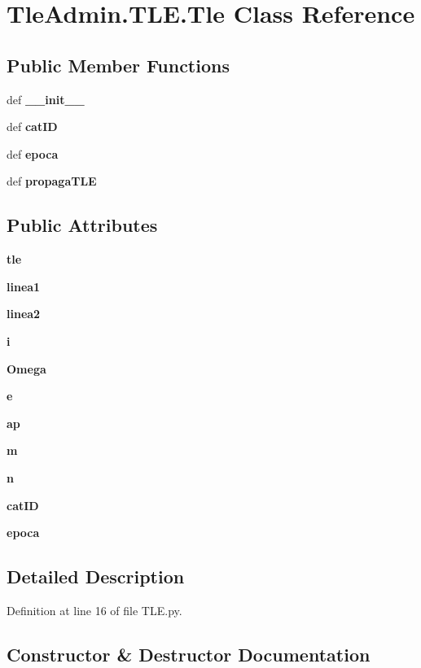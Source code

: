 \section{\-Tle\-Admin.\-T\-L\-E.\-Tle \-Class \-Reference}
\label{class_tle_admin_1_1_t_l_e_1_1_tle}
\subsection*{\-Public \-Member \-Functions}
\begin{DoxyCompactItemize}
\item 
def {\bf \-\_\-\-\_\-init\-\_\-\-\_\-}
\item 
def {\bf cat\-I\-D}
\item 
def {\bf epoca}
\item 
def {\bf propaga\-T\-L\-E}
\end{DoxyCompactItemize}
\subsection*{\-Public \-Attributes}
\begin{DoxyCompactItemize}
\item 
{\bf tle}
\item 
{\bf linea1}
\item 
{\bf linea2}
\item 
{\bf i}
\item 
{\bf \-Omega}
\item 
{\bf e}
\item 
{\bf ap}
\item 
{\bf m}
\item 
{\bf n}
\item 
{\bf cat\-I\-D}
\item 
{\bf epoca}
\end{DoxyCompactItemize}


\subsection{\-Detailed \-Description}


\-Definition at line 16 of file \-T\-L\-E.\-py.



\subsection{\-Constructor \& \-Destructor \-Documentation}

